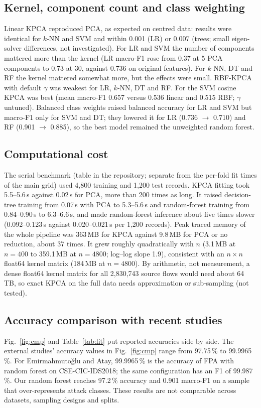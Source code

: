 \documentclass[runningheads]{llncs}
\begin{document}
\subsection{Kernel, component count and class weighting}
Linear KPCA reproduced PCA, as expected on centred data: results were identical for $k$-NN and SVM and within 0.001 (LR) or 0.007 (trees; small eigen-solver differences, not investigated). For LR and SVM the number of components mattered more than the kernel (LR macro-F1 rose from 0.37 at 5 PCA components to 0.73 at 30, against 0.736 on original features). For $k$-NN, DT and RF the kernel mattered somewhat more, but the effects were small. RBF-KPCA with default $\gamma$ was weakest for LR, $k$-NN, DT and RF. For the SVM cosine KPCA was best (mean macro-F1 0.657 versus 0.536 linear and 0.515 RBF; $\gamma$ untuned). Balanced class weights raised balanced accuracy for LR and SVM but macro-F1 only for SVM and DT; they lowered it for LR (0.736 $\to$ 0.710) and RF (0.901 $\to$ 0.885), so the best model remained the unweighted random forest.

\subsection{Computational cost}
The serial benchmark (table in the repository; separate from the per-fold fit times of the main grid) used 4{,}800 training and 1{,}200 test records. KPCA fitting took 5.5--5.6\,s against 0.02\,s for PCA, more than 200 times as long. It raised decision-tree training from 0.07\,s with PCA to 5.3--5.6\,s and random-forest training from 0.84--0.90\,s to 6.3--6.6\,s, and made random-forest inference about five times slower (0.092--0.123\,s against 0.020--0.021\,s per 1{,}200 records). Peak traced memory of the whole pipeline was 363\,MB for KPCA against 9.8\,MB for PCA or no reduction, about 37 times. It grew roughly quadratically with $n$ (3.1\,MB at $n=400$ to 359.1\,MB at $n=4800$; log--log slope 1.9), consistent with an $n\times n$ float64 kernel matrix (184\,MB at $n=4800$). By arithmetic, not measurement, a dense float64 kernel matrix for all 2{,}830{,}743 source flows would need about 64\,TB, so exact KPCA on the full data needs approximation or sub-sampling (not tested).







\subsection{Accuracy comparison with recent studies}
Fig.~\ref{fig:cmp} and Table~\ref{tab:lit} put reported accuracies side by side. The external studies' accuracy values in Fig.~\ref{fig:cmp} range from 97.75\,\% to 99.9965\,\%. For Emirmahmuto\u{g}lu and Atay, 99.9965\,\% is the accuracy of FPA with random forest on CSE-CIC-IDS2018; the same configuration has an F1 of 99.987\,\%. Our random forest reaches 97.2\,\% accuracy and 0.901 macro-F1 on a sample that over-represents attack classes. These results are not comparable across datasets, sampling designs and splits.
\end{document}
